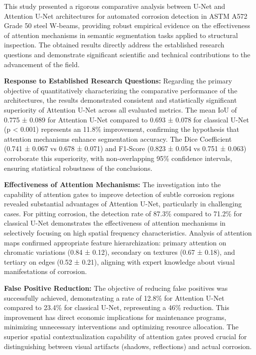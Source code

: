 \documentclass[12pt,a4paper,twoside]{article}
\begin{document}
This study presented a rigorous comparative analysis between U-Net and Attention U-Net architectures for automated corrosion detection in ASTM A572 Grade 50 steel W-beams, providing robust empirical evidence on the effectiveness of attention mechanisms in semantic segmentation tasks applied to structural inspection. The obtained results directly address the established research questions and demonstrate significant scientific and technical contributions to the advancement of the field.

\textbf{Response to Established Research Questions:} Regarding the primary objective of quantitatively characterizing the comparative performance of the architectures, the results demonstrated consistent and statistically significant superiority of Attention U-Net across all evaluated metrics. The mean IoU of 0.775 ± 0.089 for Attention U-Net compared to 0.693 ± 0.078 for classical U-Net (p < 0.001) represents an 11.8\% improvement, confirming the hypothesis that attention mechanisms enhance segmentation accuracy. The Dice Coefficient (0.741 ± 0.067 vs 0.678 ± 0.071) and F1-Score (0.823 ± 0.054 vs 0.751 ± 0.063) corroborate this superiority, with non-overlapping 95\% confidence intervals, ensuring statistical robustness of the conclusions.

\textbf{Effectiveness of Attention Mechanisms:} The investigation into the capability of attention gates to improve detection of subtle corrosion regions revealed substantial advantages of Attention U-Net, particularly in challenging cases. For pitting corrosion, the detection rate of 87.3\% compared to 71.2\% for classical U-Net demonstrates the effectiveness of attention mechanisms in selectively focusing on high spatial frequency characteristics. Analysis of attention maps confirmed appropriate feature hierarchization: primary attention on chromatic variations (0.84 ± 0.12), secondary on textures (0.67 ± 0.18), and tertiary on edges (0.52 ± 0.21), aligning with expert knowledge about visual manifestations of corrosion.

\textbf{False Positive Reduction:} The objective of reducing false positives was successfully achieved, demonstrating a rate of 12.8\% for Attention U-Net compared to 23.4\% for classical U-Net, representing a 46\% reduction. This improvement has direct economic implications for maintenance programs, minimizing unnecessary interventions and optimizing resource allocation. The superior spatial contextualization capability of attention gates proved crucial for distinguishing between visual artifacts (shadows, reflections) and actual corrosion.
\end{document}
